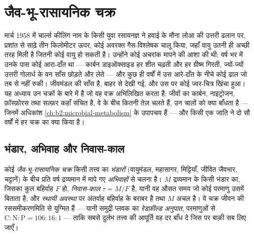 \chapter{जैव-भू-रासायनिक चक्र}\label{ch:b2:biogeochemical-cycles}

मार्च 1958 में चार्ल्स कीलिंग नाम के किसी युवा रसायनज्ञ ने हवाई के
मौना लोआ की उत्तरी ढलान पर, प्रशांत से साढ़े तीन किलोमीटर ऊपर,
कोई अवरक्त गैस-विश्लेषक चालू किया, जहाँ वायु उतनी ही अच्छी तरह मिली है
जितनी कोई वायु हो सकती है। उन्होंने कोई अचरांक मापने की आशा की थी;
वर्ष भर में उनके पास कोई आरा-दाँत था --- कार्बन डाइऑक्साइड हर
शीत चढ़ती और हर ग्रीष्म गिरती, ज्यों-ज्यों उत्तरी गोलार्ध के वन
साँस छोड़ते और लेते --- और कुछ ही वर्षों में उस आरे-दाँत के नीचे कोई
ढाल जो तब से नहीं रुकी। 
जीवमंडल की साँस है, बाहर से देखी गई, और उस पर कोई ज्वर-चित्र
खिंचा हुआ। यह अध्याय उन चक्रों के बारे में है जो वह वक्र अभिलिखित करता है:
जीवों का कार्बन, नाइट्रोजन, फ़ॉस्फ़ोरस तथा सल्फ़र
कहाँ संचित है, वे  के बीच कितनी तेज़ चलते हैं, उन चालों को क्या
बाँधता है --- जिनमें अधिकांश
\cref{ch:b2:microbial-metabolism} के उपापचय हैं --- और किसी एक जाति ने
दो सौ वर्षों में हर चक्र का क्या किया है।

\section{भंडार, अभिवाह और निवास-काल}

\begin{definition}[भंडार, अभिवाह, निवास-काल]\label{def:b2:biogeochemical-cycles:reservoir}
कोई \emph{जैव-भू-रासायनिक चक्र} किसी तत्त्व का
\emph{भंडारों} (वायुमंडल, महासागर, मिट्टियाँ, जीवित
जैवभार, चट्टानें) के बीच प्रति वर्ष द्रव्यमान में मापे गए \emph{अभिवाहों} से चलना है।
$M$ द्रव्यमान के किसी भंडार का, जिसका कुल बहिर्वाह $F$ हो,
\emph{निवास-काल} $\tau = M/F$ है, यानी वह औसत समय जो कोई परमाणु उसमें बिताता है;
और \emph{स्थायी अवस्था} पर अंतर्वाह बहिर्वाह के बराबर है तथा $M$ अचल है। वे
चक्र जीवन की रससमीकरणमिति से युग्मित हैं --- यानी समुद्री प्लवक का
\emph{रेडफ़ील्ड अनुपात}, परमाणुओं से $\mathrm{C:N:P} =
106:16:1$ --- ताकि सबसे दुर्लभ तत्त्व की आपूर्ति
वह दर बाँध दे जिस पर बाक़ी सब लिए जाएँ।
\end{definition}

